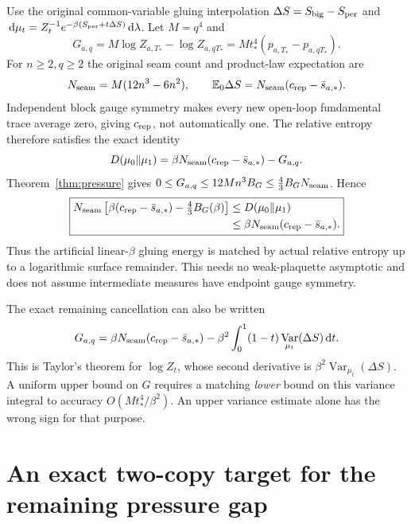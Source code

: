 \documentclass[11pt,letterpaper]{article}
\theoremstyle{plain}
\theoremstyle{remark}\newtheorem{remark}[theorem]{Scope}
\DeclareMathOperator{\Var}{Var}\DeclareMathOperator{\Cov}{Cov}
\newcommand{\E}{\mathbb E}\newcommand{\R}{\mathbb R}
\newcommand{\dd}{\,\mathrm d}\newcommand{\OH}{\mathcal O_H}
\begin{document}
Use the original common-variable gluing interpolation
$\Delta S=S_{\rm big}-S_{\rm per}$ and
$\dd\mu_t=Z_t^{-1}e^{-\beta(S_{\rm per}+t\Delta S)}\dd\lambda$.
Let $M=q^4$ and
\begin{equation}
G_{a,q}=M\log Z_{a,T_*}-\log Z_{a,qT_*}
=Mt_*^4(p_{a,T_*}-p_{a,qT_*}).
\label{eq:seamG}
\end{equation}
For $n\ge2,q\ge2$ the original seam count and product-law expectation are
\begin{equation}
N_{\rm seam}=M(12n^3-6n^2),\qquad
\E_0\Delta S=N_{\rm seam}(c_{\rm rep}-\bar s_{a,*}).
\label{eq:seamcount}
\end{equation}
Independent block gauge symmetry makes every new open-loop fundamental trace
average zero, giving $c_{\rm rep}$, not automatically one. The relative entropy
therefore satisfies the exact identity
\begin{equation}
D(\mu_0\Vert\mu_1)
=\beta N_{\rm seam}(c_{\rm rep}-\bar s_{a,*})-G_{a,q}.
\label{eq:seamentropy}
\end{equation}
Theorem~\ref{thm:pressure} gives
$0\le G_{a,q}\le12Mn^3B_G\le\frac43B_GN_{\rm seam}$. Hence
\begin{equation}
\boxed{\begin{aligned}
N_{\rm seam}\left[\beta(c_{\rm rep}-\bar s_{a,*})-\tfrac43B_G(\beta)\right]
&\le D(\mu_0\Vert\mu_1)\\
&\le\beta N_{\rm seam}(c_{\rm rep}-\bar s_{a,*}).
\end{aligned}}
\label{eq:seamcancellation}
\end{equation}
Thus the artificial linear-$\beta$ gluing energy is matched by actual relative
entropy up to a logarithmic surface remainder. This needs no weak-plaquette
asymptotic and does not assume intermediate measures have endpoint gauge symmetry.

The exact remaining cancellation can also be written
\begin{equation}
G_{a,q}=\beta N_{\rm seam}(c_{\rm rep}-\bar s_{a,*})
-\beta^2\int_0^1(1-t)\Var_{\mu_t}(\Delta S)\dd t.
\label{eq:variancecancellation}
\end{equation}
This is Taylor's theorem for $\log Z_t$, whose second derivative is
$\beta^2\Var_{\mu_t}(\Delta S)$. A uniform upper bound on $G$ requires a
matching \emph{lower} bound on this variance integral to accuracy
$O(Mt_*^4/\beta^2)$. An upper variance estimate alone has the wrong sign for
that purpose.
\section{An exact two-copy target for the remaining pressure gap}
\label{sec:pressuretarget}
\end{document}
